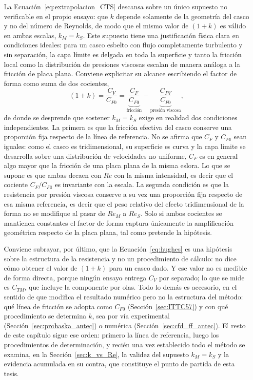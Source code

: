 La Ecuación~\eqref{eq:extrapolacion_CTS} descansa sobre un único supuesto no
verificable en el propio ensayo: que $k$ depende solamente de la geometría del
casco y no del número de Reynolds, de modo que el mismo valor de $(1+k)$ es
válido en ambas escalas, $k_M = k_S$. Este supuesto tiene una justificación
física clara en condiciones ideales: para un casco esbelto con flujo
completamente turbulento y sin separación, la capa límite es delgada en toda la
superficie y tanto la fricción local como la distribución de presiones viscosas
escalan de manera análoga a la fricción de placa plana. Conviene explicitar su
alcance escribiendo el factor de forma como suma de dos cocientes,
%
\begin{equation}\label{eq:k_dos_cocientes}
    (1+k) = \frac{C_V}{C_{F0}} = \underbrace{\frac{C_F}{C_{F0}}}_{\text{fricción}}
          + \underbrace{\frac{C_{PV}}{C_{F0}}}_{\text{presión viscosa}},
\end{equation}
%
de donde se desprende que sostener $k_M = k_S$ exige en realidad dos condiciones
independientes. La primera es que la fricción efectiva del casco conserve una
proporción fija respecto de la línea de referencia. No se afirma que $C_F$ y
$C_{F0}$ sean iguales: como el casco es tridimensional, su superficie es curva y la
capa límite se desarrolla sobre una distribución de velocidades no uniforme,
$C_F$ es en general algo mayor que la fricción de una placa plana de la
misma eslora. Lo que se supone es que ambas decaen con $Re$ con la misma intensidad, es decir
que el cociente $C_F/C_{F0}$ es invariante con la escala. La segunda condición es
que la resistencia por presión viscosa conserve a su vez una proporción fija
respecto de esa misma referencia, es decir que el peso relativo del efecto
tridimensional de la forma no se modifique al pasar de $Re_M$ a $Re_S$. Solo si
ambos cocientes se mantienen constantes el factor de forma captura únicamente la
amplificación geométrica respecto de la placa plana, tal como pretende la
hipótesis.

Conviene subrayar, por último, que la Ecuación~\eqref{eq:hughes} es una hipótesis
sobre la estructura de la resistencia y no un procedimiento de cálculo: no dice
cómo obtener el valor de $(1+k)$ para un casco dado. Y ese valor no es medible de
forma directa, porque ningún ensayo entrega $C_V$ por separado; lo que se mide es
$C_{TM}$, que incluye la componente por olas. Todo lo demás es accesorio, en el sentido
de que modifica el resultado numérico pero no la estructura del método: qué
línea de fricción se adopta como $C_{F0}$ (Sección~\ref{sec:ITTC57}) y con qué
procedimiento se determina $k$, sea por vía experimental
(Sección~\ref{sec:prohaska_antec}) o numérica (Sección~\ref{sec:cfd_ff_antec}). El resto de este capítulo sigue ese
orden: primero la línea de referencia, luego los procedimientos de determinación,
y recién una vez establecido todo el método se examina, en la
Sección~\ref{sec:k_vs_Re}, la validez del supuesto $k_M = k_S$ y la evidencia
acumulada en su contra, que constituye el punto de partida de esta tesis.

